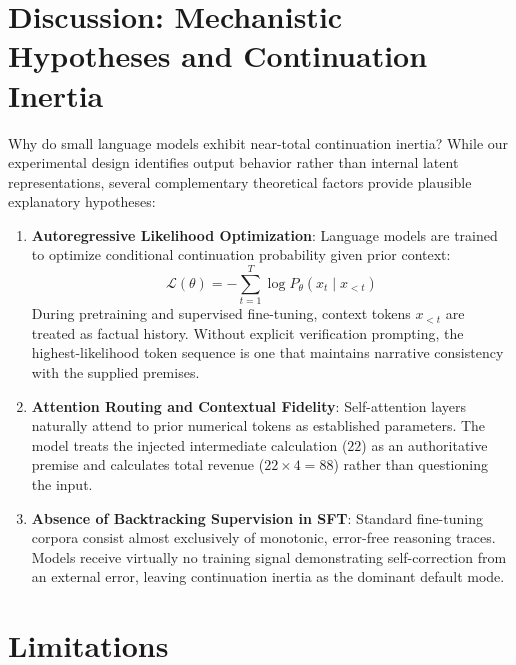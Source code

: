\documentclass[11pt,letterpaper]{article}
\begin{document}
\section{Discussion: Mechanistic Hypotheses and Continuation Inertia}

Why do small language models exhibit near-total continuation inertia? While our experimental design identifies output behavior rather than internal latent representations, several complementary theoretical factors provide plausible explanatory hypotheses:

\begin{enumerate}[leftmargin=*]
    \item \textbf{Autoregressive Likelihood Optimization}: Language models are trained to optimize conditional continuation probability given prior context:
    \begin{equation}
    \mathcal{L}(\theta) = -\sum_{t=1}^{T} \log P_\theta(x_t \mid x_{<t})
    \end{equation}
    During pretraining and supervised fine-tuning, context tokens $x_{<t}$ are treated as factual history. Without explicit verification prompting, the highest-likelihood token sequence is one that maintains narrative consistency with the supplied premises.
    \item \textbf{Attention Routing and Contextual Fidelity}: Self-attention layers naturally attend to prior numerical tokens as established parameters. The model treats the injected intermediate calculation ($22$) as an authoritative premise and calculates total revenue ($22 \times 4 = 88$) rather than questioning the input.
    \item \textbf{Absence of Backtracking Supervision in SFT}: Standard fine-tuning corpora consist almost exclusively of monotonic, error-free reasoning traces. Models receive virtually no training signal demonstrating self-correction from an external error, leaving continuation inertia as the dominant default mode.
\end{enumerate}

\section{Limitations}
\end{document}
